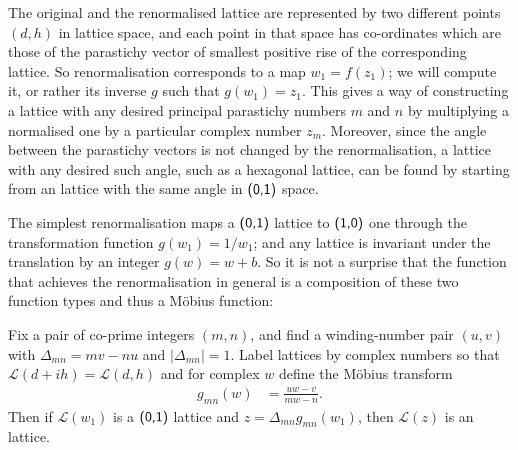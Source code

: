 
The original and the renormalised lattice are represented by two different points $(d,h)$ in lattice space, and each point in that space has co-ordinates which are those of the parastichy vector of smallest positive rise of the corresponding lattice. So renormalisation corresponds to a map $w_1=f(z_1)$; we will compute it, or rather its inverse $g$ such that $g(w_1)=z_1$. This gives a way of constructing a lattice with any desired principal parastichy numbers $m$ and $n$ by multiplying a normalised one by a particular complex number $z_m$. Moreover, since the angle between the parastichy vectors is not changed by the renormalisation, a lattice with any desired such angle, such as a hexagonal lattice, can be found by starting from an lattice with the same angle in $\textsf{(0,1)}$ space. 

The simplest renormalisation maps a $\textsf{(0,1)}$ lattice to $\textsf{(1,0)}$ one through the transformation  function $g(w_1)=1/w_1$; and any lattice is invariant under the translation by an integer $g(w)=w+b$. So it is not a surprise that 
 the function that achieves the renormalisation in general is a composition of these two function types and thus a M\"obius function:
\begin{theorem}
		\label{thm:renormalization}
	Fix a pair of co-prime integers $(m,n)$,  and find a winding-number pair $(u,v)$ with  $\Delta_{mn}=mv-nu$ and $|\Delta_{mn}|=1$. Label lattices by complex numbers so that  $\mathcal{L}(d+ih)=\mathcal{L}(d,h)$ and for complex $w$ define the M\"obius transform
	\begin{align}
		\label{eq:gDefinition}
		g_{mn}(w)& = \frac{ u   w- v}{ m  w   -n}.
	\end{align}
Then if	$\mathcal{L}(w_1)$ is a $\textsf{(0,1)}$ lattice and $z= \Delta_{mn} g_{mn}(w_1)$,   then $\mathcal{L}(z)$ is an  lattice.  
\end{theorem}

